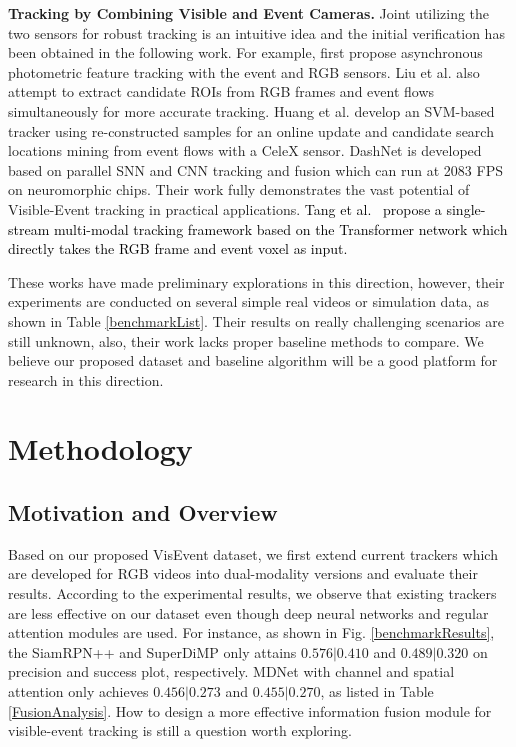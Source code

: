 \documentclass[journal]{IEEEtran}
\begin{document}
\noindent 
\textbf{Tracking by Combining Visible and Event Cameras.} 
Joint utilizing the two sensors for robust tracking is an intuitive idea and the initial verification has been obtained in the following work. For example, \cite{gehrig2018asynchronous, gehrig2020eklt} first propose asynchronous photometric feature tracking with the event and RGB sensors. Liu et al. \cite{liu2016combined} also attempt to extract candidate ROIs from RGB frames and event flows simultaneously for more accurate tracking. Huang et al. \cite{huang2018event} develop an SVM-based tracker using re-constructed samples for an online update and candidate search locations mining from event flows with a CeleX sensor. DashNet \cite{yang2019dashnet, zhao2022HNNframework} is developed based on parallel SNN and CNN tracking and fusion which can run at 2083 FPS on neuromorphic chips. Their work fully demonstrates the vast potential of Visible-Event tracking in practical applications. \textcolor{black}{Tang et al.~\cite{tang2022coesot} propose a single-stream multi-modal tracking framework based on the Transformer network which directly takes the RGB frame and event voxel as input.} 


These works have made preliminary explorations in this direction, however, their experiments are conducted on several simple real videos or simulation data, as shown in Table \ref{benchmarkList}. Their results on really challenging scenarios are still unknown, also, their work lacks proper baseline methods to compare. We believe our proposed dataset and baseline algorithm will be a good platform for research in this direction. 








\section{Methodology} 


\subsection{Motivation and Overview} \label{motivationView}
Based on our proposed VisEvent dataset, we first extend current trackers which are developed for RGB videos into dual-modality versions and evaluate their results. According to the experimental results, we observe that existing trackers are less effective on our dataset even though deep neural networks and regular attention modules are used. For instance, as shown in Fig. \ref{benchmarkResults}, the SiamRPN++ \cite{li2018siamrpn++} and SuperDiMP \cite{bhat2019DiMP} only attains $0.576|0.410$ and $0.489|0.320$ on precision and success plot, respectively. MDNet \cite{Nam2015Learning} with channel and spatial attention only achieves $0.456|0.273$ and $0.455|0.270$, as listed in Table \ref{FusionAnalysis}. How to design a more effective information fusion module for visible-event tracking is still a question worth exploring. 
\end{document}
